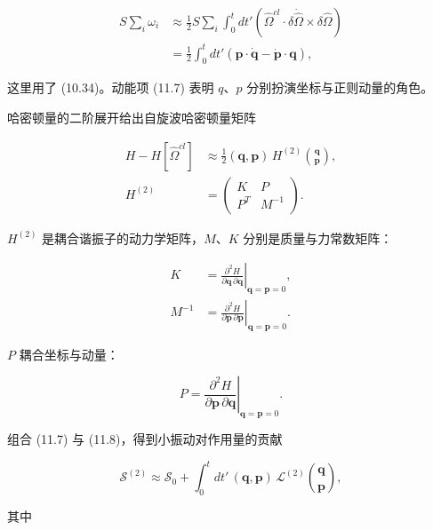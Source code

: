 \begin{align*}
S \sum_ {i} \omega_ {i} & \approx \frac {1}{2} S \sum_ {i} \int_ {0} ^ {t} d t ' \left( \hat {\Omega} ^ {cl} \cdot \delta \dot {\hat {\Omega}} \times \delta \hat {\Omega} \right)\\
& = \frac {1}{2} \int_ {0} ^ {t} d t ' \left( \mathbf {p} \cdot \dot {\mathbf {q}} - \dot {\mathbf {p}} \cdot \mathbf {q} \right),
\tag{11.7}
\end{align*}

这里用了 (10.34)。动能项 (11.7) 表明 $q$、$p$ 分别扮演坐标与正则动量的角色。

哈密顿量的二阶展开给出自旋波哈密顿量矩阵

\begin{align*}
H - H [ \hat {\Omega} ^ {cl} ] & \approx \frac {1}{2} (\mathbf {q}, \mathbf {p}) \, H ^ {(2)} \binom{\mathbf {q}}{\mathbf {p}} ,\\
H ^ {(2)} & = \left( \begin{array}{cc} K & P \\ P ^ {T} & M ^ {- 1} \end{array} \right) .
\tag{11.8}
\end{align*}

$H^{(2)}$ 是耦合谐振子的动力学矩阵，$M$、$K$ 分别是质量与力常数矩阵：

\begin{align*}
K & = \left. \frac {\partial^ {2} H}{\partial \mathbf {q} \, \partial \mathbf {q}} \right| _ {\mathbf {q} = \mathbf {p} = 0} ,\\
M ^ {- 1} & = \left. \frac {\partial^ {2} H}{\partial \mathbf {p} \, \partial \mathbf {p}} \right| _ {\mathbf {q} = \mathbf {p} = 0} .
\tag{11.9}
\end{align*}

$P$ 耦合坐标与动量：

\begin{equation*}
P = \left. \frac {\partial^ {2} H}{\partial \mathbf {p} \, \partial \mathbf {q}} \right| _ {\mathbf {q} = \mathbf {p} = 0}.
\tag{11.10}
\end{equation*}

组合 (11.7) 与 (11.8)，得到小振动对作用量的贡献

\begin{equation*}
\mathcal {S} ^ {(2)} \approx \mathcal {S} _ {0} + \int_ {0} ^ {t} d t ' \, (\mathbf {q}, \mathbf {p}) \, \mathcal {L} ^ {(2)} \binom{\mathbf {q}}{\mathbf {p}} ,
\tag{11.11}
\end{equation*}

其中

